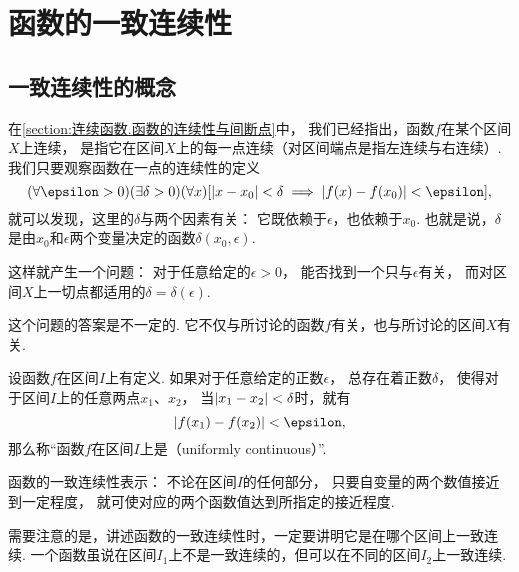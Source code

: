\section{函数的一致连续性}
\subsection{一致连续性的概念}
在\cref{section:连续函数.函数的连续性与间断点}中，
我们已经指出，函数\(f\)在某个区间\(X\)上连续，
是指它在区间\(X\)上的每一点连续（对区间端点是指左连续与右连续）.
我们只要观察函数在一点的连续性的定义\begin{equation*}
	(\forall\epsilon>0)
	(\exists\delta>0)
	(\forall x)
	[
		\abs{x - x_0} < \delta
		\implies
		\abs{f(x) - f(x_0)} < \epsilon
	],
\end{equation*}
就可以发现，这里的\(\delta\)与两个因素有关：
它既依赖于\(\epsilon\)，也依赖于\(x_0\).
也就是说，\(\delta\)是由\(x_0\)和\(\epsilon\)两个变量决定的函数\(\delta(x_0,\epsilon)\).

这样就产生一个问题：
对于任意给定的\(\epsilon>0\)，
能否找到一个只与\(\epsilon\)有关，
而对区间\(X\)上一切点都适用的\(\delta=\delta(\epsilon)\).

这个问题的答案是不一定的.
它不仅与所讨论的函数\(f\)有关，也与所讨论的区间\(X\)有关.

\begin{definition}\label{definition:极限.函数的一致连续性}
设函数\(f\)在区间\(I\)上有定义.
如果对于任意给定的正数\(\epsilon\)，
总存在着正数\(\delta\)，
使得对于区间\(I\)上的任意两点\(x_1\)、\(x_2\)，
当\(\abs{x_1 - x_2} < \delta\)时，就有\begin{equation*}
	\abs{f(x_1) - f(x_2)} < \epsilon,
\end{equation*}
那么称“函数\(f\)在区间\(I\)上是（uniformly continuous）”.
\end{definition}
函数的一致连续性表示：
不论在区间\(I\)的任何部分，
只要自变量的两个数值接近到一定程度，
就可使对应的两个函数值达到所指定的接近程度.

需要注意的是，讲述函数的一致连续性时，一定要讲明它是在哪个区间上一致连续.
一个函数虽说在区间\(I_1\)上不是一致连续的，但可以在不同的区间\(I_2\)上一致连续.

